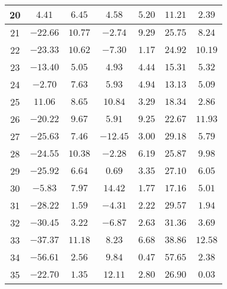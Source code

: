 \begin{table}[H]
\begin{tabular}{|c|c|c|c|c|c|c|}
                        20   &  $4.41$    &  $6.45$   &   $4.58$    &   $5.20$  &  $11.21$  & $2.39$   \\ \hline
                        21   &  $-22.66$  &  $10.77$  &   $-2.74$   &   $9.29$  &  $25.75$  & $8.24$   \\ \hline
                        22   &  $-23.33$  &  $10.62$  &   $-7.30$   &   $1.17$  &  $24.92$  & $10.19$  \\ \hline
                        23   &  $-13.40$  &  $5.05$   &   $4.93$    &   $4.44$  &  $15.31$  & $5.32$   \\ \hline
                        24   &  $-2.70$   &  $7.63$   &   $5.93$    &   $4.94$  &  $13.13$  & $5.09$   \\ \hline
                        25   &  $11.06$   &  $8.65$   &   $10.84$   &   $3.29$  &  $18.34$  & $2.86$   \\ \hline
                        26   &  $-20.22$  &  $9.67$   &   $5.91$    &   $9.25$  &  $22.67$  & $11.93$  \\ \hline
                        27   &  $-25.63$  &  $7.46$   &   $-12.45$  &   $3.00$  &  $29.18$  & $5.79$   \\ \hline
                        28   &  $-24.55$  &  $10.38$  &   $-2.28$   &   $6.19$  &  $25.87$  & $9.98$   \\ \hline
                        29   &  $-25.92$  &  $6.64$   &   $0.69$    &   $3.35$  &  $27.10$  & $6.05$   \\ \hline
                        30   &  $-5.83$   &  $7.97$   &   $14.42$   &   $1.77$  &  $17.16$  & $5.01$   \\ \hline
                        31   &  $-28.22$  &  $1.59$   &   $-4.31$   &   $2.22$  &  $29.57$  & $1.94$   \\ \hline
                        32   &  $-30.45$  &  $3.22$   &   $-6.87$   &   $2.63$  &  $31.36$  & $3.69$   \\ \hline
                        33   &  $-37.37$  &  $11.18$  &   $8.23$    &   $6.68$  &  $38.86$  & $12.58$  \\ \hline
                        34   &  $-56.61$  &  $2.56$   &   $9.84$    &   $0.47$  &  $57.65$  & $2.38$   \\ \hline
                        35   &  $-22.70$  &  $1.35$   &   $12.11$   &   $2.80$  &  $26.90$  & $0.03$   \\ \hline
        \end{tabular}
    \label{tab:media_fisica_4_total}
\end{table}

